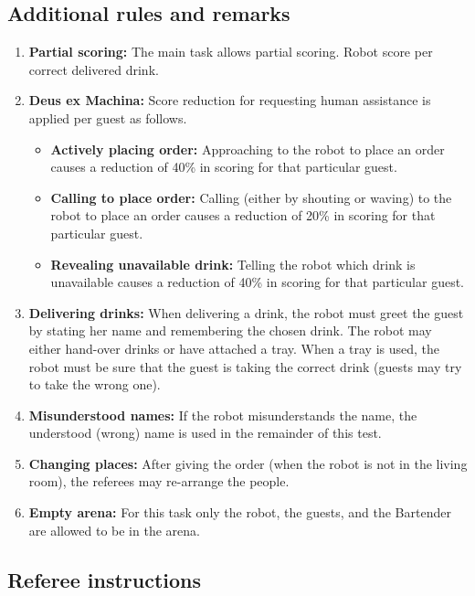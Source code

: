 \subsection{Additional rules and remarks}
\begin{enumerate}
	\item \textbf{Partial scoring:} The main task allows partial scoring.
	Robot score per correct delivered drink.

	\item \textbf{Deus ex Machina:} Score reduction for requesting human assistance is applied per guest as follows.
	\begin{itemize}[nosep]
		\item \textbf{Actively placing order:} Approaching to the robot to place an order causes a reduction of 40\% in scoring for that particular guest.

		\item \textbf{Calling to place order:} Calling (either by shouting or waving) to the robot to place an order causes a reduction of 20\% in scoring for that particular guest.

		\item \textbf{Revealing unavailable drink:} Telling the robot which drink is unavailable causes a reduction of 40\% in scoring for that particular guest.
	\end{itemize}

	\item \textbf{Delivering drinks:} When delivering a drink, the robot must greet the guest by stating her name and remembering the chosen drink.
	The robot may either hand-over drinks or have attached a tray.
	When a tray is used, the robot must be sure that the guest is taking the correct drink (guests may try to take the wrong one).

	\item \textbf{Misunderstood names:} If the robot misunderstands the name, the understood (wrong) name is used in the remainder of this test.

	\item \textbf{Changing places:} After giving the order (when the robot is not in the living room), the referees may re-arrange the people.

	\item \textbf{Empty arena:} For this task only the robot, the guests, and the Bartender are allowed to be in the arena.
\end{enumerate}

\subsection{Referee instructions}

